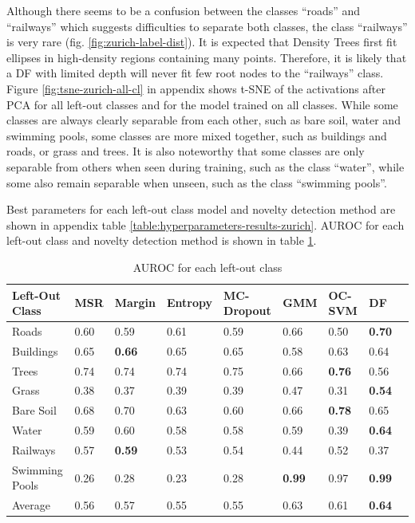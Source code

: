 \documentclass[10pt]{article}
\begin{document}
Although there seems to be a confusion between the classes ``roads'' and ``railways'' which suggests difficulties to separate both classes, the class ``railways'' is very rare (fig. \ref{fig:zurich-label-dist}). It is expected that Density Trees first fit ellipses in high-density regions containing many points. Therefore, it is likely that a \acrlong{DF} with limited depth will never fit few root nodes to the ``railways'' class. Figure \ref{fig:tsne-zurich-all-cl} in appendix shows \gls{t-SNE} of the activations after \gls{PCA} for all left-out classes and for the model trained on all classes. While some classes are always clearly separable from each other, such as bare soil, water and swimming pools, some classes are more mixed together, such as buildings and roads, or grass and trees. It is also noteworthy that some classes are only separable from others when seen during training, such as the class ``water'', while some also remain separable when unseen, such as the class ``swimming pools''.

Best parameters for each left-out class model and novelty detection method are shown in appendix table \ref{table:hyperparameters-results-zurich}. \gls{AUROC} for each left-out class and novelty detection method is shown in table \ref{table:zurich-auroc-nd}.

\begin{table}[H]
    \centering
    \begin{tabular}{@{}lllllllll@{}}
    \toprule
    Left-Out Class & MSR  & Margin     & Entropy & \gls{MC-Dropout} & \gls{GMM}     & \gls{OC-SVM}  & \gls{DF}                \\ \midrule
    Roads          &  0.60 &    0.59 &     0.61 &     0.59 &  0.66 &    0.50 &  \textbf{0.70} \\
    Buildings      &  0.65 &    \textbf{0.66} &     0.65 &     0.65 &  0.58 &    0.63 &  0.64 \\
    Trees          &  0.74 &    0.74 &     0.74 &     0.75 &  0.66 &    \textbf{0.76} &  0.56 \\
    Grass          &  0.38 &    0.37 &     0.39 &     0.39 &  0.47 &    0.31 &  \textbf{0.54} \\
    Bare Soil      &  0.68 &    0.70 &     0.63 &     0.60 &  0.66 &    \textbf{0.78} &  0.65 \\
    Water          &  0.59 &    0.60 &     0.58 &     0.58 &  0.59 &    0.39 &  \textbf{0.64} \\
    Railways       &  0.57 &    \textbf{0.59} &     0.53 &     0.54 &  0.44 &    0.52 &  0.37 \\
    Swimming Pools &  0.26 &    0.28 &     0.23 &     0.28 &  \textbf{0.99} &    0.97 &  \textbf{0.99} \\\midrule
    Average        &  0.56 & 0.57 & 0.55 & 0.55 & 0.63 & 0.61 & \textbf{0.64} \\\bottomrule
    \end{tabular}
    \caption{\gls{AUROC} for each left-out class}
    \label{table:zurich-auroc-nd}
\end{table}
\end{document}
